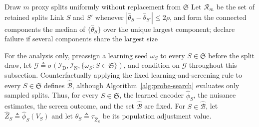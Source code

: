\begin{algorithm}[t]
\caption{PROBE split search, detailed form}
\label{appdetail:alg:probe-search}
	Draw $m$ proxy splits uniformly without replacement from $\mathfrak S$\label{ln:sample}\;
	Let $\mathcal R_m$ be the set of retained splits\label{ln:screen-end}\;
	Link $S$ and $S'$ whenever $|\widehat\theta_S-\widehat\theta_{S'}|\le2\rho$, and form the connected components\label{ln:link}\;
	\Return the median of $\{\widehat\theta_S\}$ over the unique largest component; declare failure if several components share the largest size\label{ln:return}\;
\end{algorithm}
\FloatBarrier

 For the analysis only, preassign a learning seed $\omega_S$ to every $S\in\mathfrak S$ before the split draw, let $\mathcal G\triangleq\sigma(\mathcal I_{\mathrm D},\mathcal I_{\mathrm N},\{\omega_S:S\in\mathfrak S\})$, and condition on $\mathcal G$ throughout this subsection. Counterfactually applying the fixed learning-and-screening rule to every $S\in\mathfrak S$ defines $\widehat{\mathcal B}$, although Algorithm~\ref{alg:probe-search} evaluates only sampled splits. Thus, for every $S\in\mathfrak S$, the learned encoder $\widehat\phi_S$, the nuisance estimates, the screen outcome, and the set $\widehat{\mathcal B}$ are fixed. For $S\in\widehat{\mathcal B}$, let $\widehat Z_S\triangleq\widehat\phi_S(V_S)$ and let $\theta_S\triangleq\tau_{\widehat Z_S}$ be its population adjustment value.

